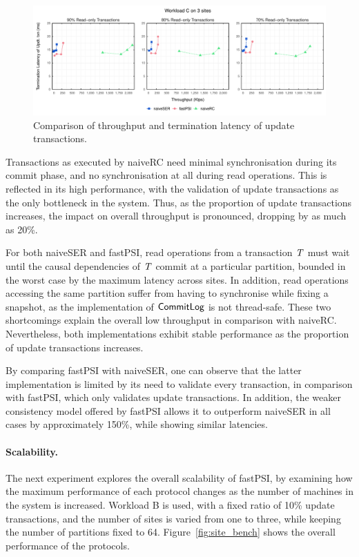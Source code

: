 \begin{figure}[t]
\vspace{-0.5cm}
\includegraphics[width=\textwidth]{figures/general_bench.pdf}
\vspace{-1cm}
\caption{Comparison of throughput and termination latency of update transactions.}
\label{fig:general_bench}
\end{figure}

Transactions as executed by naiveRC need minimal synchronisation during its commit phase, and no synchronisation at all during read operations. This is reflected in its high performance, with the validation of update transactions as the only bottleneck in the system. Thus, as the proportion of update transactions increases, the impact on overall throughput is pronounced, dropping by as much as 20\%.

For both naiveSER and fastPSI, read operations from a transaction $\mathit{T}$ must wait until the causal dependencies of $\mathit{T}$ commit at a particular partition, bounded in the worst case by the maximum latency across sites. In addition, read operations accessing the same partition suffer from having to synchronise while fixing a snapshot, as the implementation of $\mathsf{CommitLog}$ is not thread-safe. These two shortcomings explain the overall low throughput in comparison with naiveRC. Nevertheless, both implementations exhibit stable performance as the proportion of update transactions increases.

By comparing fastPSI with naiveSER, one can observe that the latter implementation is limited by its need to validate every transaction, in comparison with fastPSI, which only validates update transactions. In addition, the weaker consistency model offered by fastPSI allows it to outperform naiveSER in all cases by approximately 150\%, while showing similar latencies.

\paragraph{Scalability.} The next experiment explores the overall scalability of fastPSI, by examining how the maximum performance of each protocol changes as the number of machines in the system is increased. Workload B is used, with a fixed ratio of 10\% update transactions, and the number of sites is varied from one to three, while keeping the number of partitions fixed to 64. Figure~\ref{fig:site_bench} shows the overall performance of the protocols.

